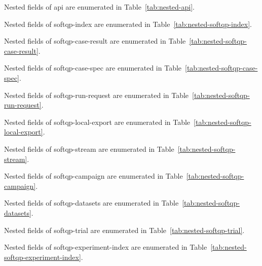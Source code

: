 

Nested fields of api are enumerated in Table~\ref{tab:nested-api}.



Nested fields of softqp-index are enumerated in Table~\ref{tab:nested-softqp-index}.



Nested fields of softqp-case-result are enumerated in Table~\ref{tab:nested-softqp-case-result}.



Nested fields of softqp-case-spec are enumerated in Table~\ref{tab:nested-softqp-case-spec}.



Nested fields of softqp-run-request are enumerated in Table~\ref{tab:nested-softqp-run-request}.



Nested fields of softqp-local-export are enumerated in Table~\ref{tab:nested-softqp-local-export}.



Nested fields of softqp-stream are enumerated in Table~\ref{tab:nested-softqp-stream}.



Nested fields of softqp-campaign are enumerated in Table~\ref{tab:nested-softqp-campaign}. %


Nested fields of softqp-datasets are enumerated in Table~\ref{tab:nested-softqp-datasets}.



Nested fields of softqp-trial are enumerated in Table~\ref{tab:nested-softqp-trial}.



Nested fields of softqp-experiment-index are enumerated in Table~\ref{tab:nested-softqp-experiment-index}.




